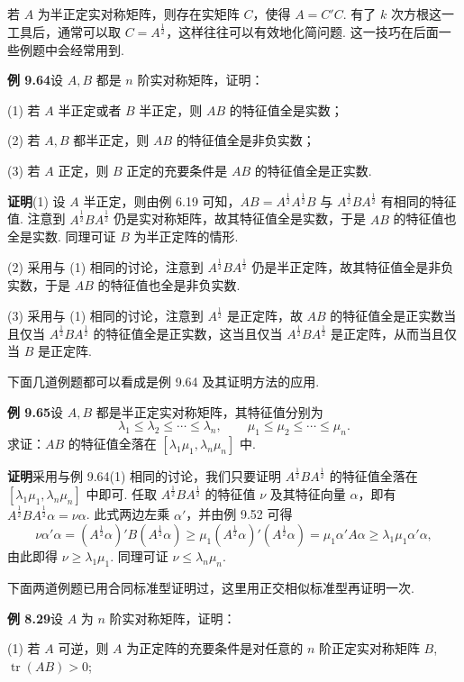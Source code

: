 \documentclass[UTF8, 12pt, fontset=fandol, oneside]{ctexart}
\begin{document}
若 $A$ 为半正定实对称矩阵，则存在实矩阵 $C$，使得 $A=C'C$. 有了 $k$ 次方根这一工具后，通常可以取 $C=A^{\frac12}$，这样往往可以有效地化简问题. 这一技巧在后面一些例题中会经常用到.

\noindent\textbf{例 9.64}\quad 设 $A,B$ 都是 $n$ 阶实对称矩阵，证明：

(1) 若 $A$ 半正定或者 $B$ 半正定，则 $AB$ 的特征值全是实数；

(2) 若 $A,B$ 都半正定，则 $AB$ 的特征值全是非负实数；

(3) 若 $A$ 正定，则 $B$ 正定的充要条件是 $AB$ 的特征值全是正实数.

\noindent\textbf{证明}\quad (1) 设 $A$ 半正定，则由例 6.19 可知，$AB=A^{\frac12}A^{\frac12}B$ 与 $A^{\frac12}BA^{\frac12}$ 有相同的特征值. 注意到 $A^{\frac12}BA^{\frac12}$ 仍是实对称矩阵，故其特征值全是实数，于是 $AB$ 的特征值也全是实数. 同理可证 $B$ 为半正定阵的情形.

(2) 采用与 (1) 相同的讨论，注意到 $A^{\frac12}BA^{\frac12}$ 仍是半正定阵，故其特征值全是非负实数，于是 $AB$ 的特征值也全是非负实数.

(3) 采用与 (1) 相同的讨论，注意到 $A^{\frac12}$ 是正定阵，故 $AB$ 的特征值全是正实数当且仅当 $A^{\frac12}BA^{\frac12}$ 的特征值全是正实数，这当且仅当 $A^{\frac12}BA^{\frac12}$ 是正定阵，从而当且仅当 $B$ 是正定阵.

下面几道例题都可以看成是例 9.64 及其证明方法的应用.

\noindent\textbf{例 9.65}\quad 设 $A,B$ 都是半正定实对称矩阵，其特征值分别为
\[
\lambda_1\le\lambda_2\le\cdots\le\lambda_n,\qquad
\mu_1\le\mu_2\le\cdots\le\mu_n.
\]
求证：$AB$ 的特征值全落在 $[\lambda_1\mu_1,\lambda_n\mu_n]$ 中.

\noindent\textbf{证明}\quad 采用与例 9.64(1) 相同的讨论，我们只要证明 $A^{\frac12}BA^{\frac12}$ 的特征值全落在 $[\lambda_1\mu_1,\lambda_n\mu_n]$ 中即可. 任取 $A^{\frac12}BA^{\frac12}$ 的特征值 $\nu$ 及其特征向量 $\alpha$，即有 $A^{\frac12}BA^{\frac12}\alpha=\nu\alpha$. 此式两边左乘 $\alpha'$，并由例 9.52 可得
\[
\nu\alpha'\alpha=(A^{\frac12}\alpha)'B(A^{\frac12}\alpha)\ge\mu_1(A^{\frac12}\alpha)'(A^{\frac12}\alpha)=\mu_1\alpha'A\alpha\ge\lambda_1\mu_1\alpha'\alpha,
\]
由此即得 $\nu\ge\lambda_1\mu_1$. 同理可证 $\nu\le\lambda_n\mu_n$.

下面两道例题已用合同标准型证明过，这里用正交相似标准型再证明一次.

\noindent\textbf{例 8.29}\quad 设 $A$ 为 $n$ 阶实对称矩阵，证明：

(1) 若 $A$ 可逆，则 $A$ 为正定阵的充要条件是对任意的 $n$ 阶正定实对称矩阵 $B$, $\operatorname{tr}(AB)>0$;
\end{document}
